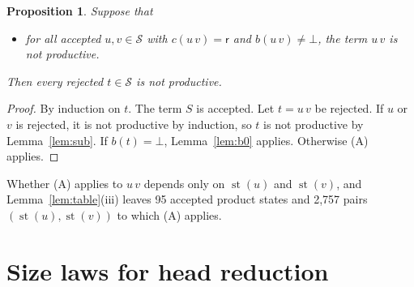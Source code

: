 \documentclass[11pt]{amsart}
\newtheorem{proposition}[theorem]{Proposition}
\theoremstyle{definition}
\theoremstyle{remark}
\newcommand{\rej}{\mathsf{r}}
\newcommand{\st}{\operatorname{st}}
\begin{document}
\begin{proposition}\label{prop:reduce}
Suppose that
\begin{itemize}
\item[\textup{(A)}] for all accepted $u,v\in\mathcal S$ with $c(u\,v)=\rej$ and
  $b(u\,v)\ne\bot$, the term $u\,v$ is not productive.
\end{itemize}
Then every rejected $t\in\mathcal S$ is not productive.
\end{proposition}
\begin{proof}
By induction on $t$. The term $S$ is accepted. Let $t=u\,v$ be rejected. If $u$ or
$v$ is rejected, it is not productive by induction, so $t$ is not productive by
Lemma~\ref{lem:sub}. If $b(t)=\bot$, Lemma~\ref{lem:b0} applies. Otherwise (A) applies.
\end{proof}

Whether (A) applies to $u\,v$ depends only on $\st(u)$ and $\st(v)$, and Lemma~\ref{lem:table}(iii) leaves
95 accepted product states and 2,757 pairs $(\st(u),\st(v))$ to which (A) applies.

\section{Size laws for head reduction}\label{sec:laws}
\end{document}

